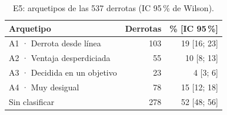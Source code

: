 \begin{table}[H]
\centering\small
\caption{E5: arquetipos de las 537 derrotas (IC 95\,\% de Wilson).}
\label{tab:arquetipos}
\begin{tabular}{lrr}
\toprule
Arquetipo & Derrotas & \% [IC 95\,\%] \\
\midrule
A1 · Derrota desde línea & 103 & 19 [16; 23] \\
A2 · Ventaja desperdiciada & 55 & 10 [8; 13] \\
A3 · Decidida en un objetivo & 23 & 4 [3; 6] \\
A4 · Muy desigual & 78 & 15 [12; 18] \\
Sin clasificar & 278 & 52 [48; 56] \\
\bottomrule
\end{tabular}
\end{table}
